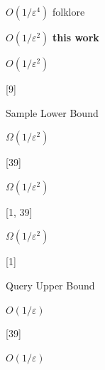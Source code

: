 \documentclass[10pt,a4paper]{article}
\begin{document}
\par



 





$O(1/\varepsilon^{4})$ folklore 
\par



$O(1/\varepsilon^{2})$\textbf{ this work}
 
\par



 




$O(1/\varepsilon^{2})$ 
\par


[9] 
\par



 
\par


Sample Lower Bound 




$\Omega(1/\varepsilon^{2})$ 
\par


[39] 
\par



 




$\Omega(1/\varepsilon^{2})$ 
\par


[1, 39] 
\par



 




$\Omega(1/\varepsilon^{2})$ 
\par


[1] 
\par



 
\par


Query Upper Bound 




$O(1/\varepsilon)$ 
\par


[39] 
\par



 




$O(1/\varepsilon)$ 
\par
\end{document}
